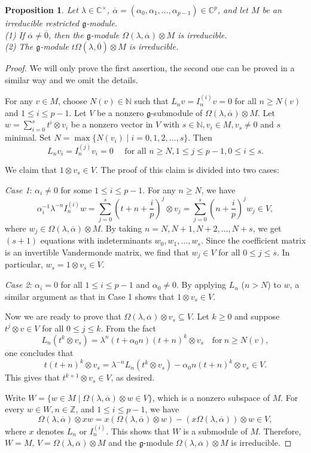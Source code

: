 \documentclass[12pt, reqno]{amsart}
\numberwithin{equation}{section}
\newtheorem{proposition}[theorem]{Proposition}%
\numberwithin{equation}{section}
\def\lmd{\lambda}
\def\al{\alpha}
\def\g{\mathfrak{g}}
\newcommand{\C}{\mathbb C}
\newcommand{\N}{\mathbb{N}}
\newcommand{\Z}{\mathbb{Z}}
\newcommand{\ov}[1]{\overline{#1}}
\newcommand{\elei}[2]{I_{#1}^{(#2)}}
\begin{document}
\begin{proposition}\label{prop5.1}
 Let $\lmd\in\C^\times$, $\ov\al=(\al_0,\al_1,\dots,\al_{p-1})\in\C^p$, and let $M$ be an irreducible restricted $\g$-module. \\
 (1) If $\ov\al\neq \ov0$, then the $\g$-module $\Omega(\lmd,\ov\al)\otimes M$ is irreducible.\\
 (2) The $\g$-module $t\Omega(\lmd,\ov0)\otimes M$ is irreducible.
\end{proposition}
\begin{proof}
 We will only prove the first assertion, the second one can be proved in a similar way and we omit the details.

 For any $v\in M$, choose $N(v)\in\N$ such that $L_nv=\elei ni v=0$ for all $n\geq N(v)$ and $1\leq i\leq p-1$.
 Let $V$ be a nonzero $\g$-submodule of $\Omega(\lmd,\ov\al)\otimes M$.
 Let $w=\sum_{i=0}^st^i\otimes v_i$ be a nonzero vector in $V$  with $s\in \N, v_i\in M, v_s\neq 0$ and $s$ minimal.
 Set $N=\max\{N(v_i)\mid i=0,1,2,\dots,s\}$. Then
 $$L_nv_i=\elei njv_i=0\quad\text{ for all }n\geq N, 1\leq j\leq p-1, 0\leq i\leq s.$$

 We claim that $1\otimes v_s\in V$.
 The proof of this claim is divided into two cases:

 {\em Case 1}: $\al_i\neq 0$ for some $1\leq i\leq p-1$. For any $n\geq N$, we have
 $$\al_i^{-1}\lmd^{-n}\elei niw=\sum_{j=0}^s\left(t+n+\frac ip\right)^j\otimes v_j=
      \sum_{j=0}^s\left(n+\frac ip\right)^jw_j\in V,$$
 where $w_j\in\Omega(\lmd,\ov\al)\otimes M$.
 By taking $n=N, N+1,N+2,\dots,N+s$, we get $(s+1)$ equations with indeterminants $w_0,w_1,\dots,w_s$.
 Since the coefficient matrix  is an invertible Vandermonde matrix,
 we find that $w_j\in V$ for all $0\le j\le s$.
 In particular, $w_s=1\otimes v_s\in V$.

 {\em Case 2}: $\al_i=0$ for all $1\leq i\leq p-1$ and $\al_0\neq 0$.
 By  applying $L_n$ ($n>N$) to $w$,
 a similar argument as that in Case 1 shows that $1\otimes v_s\in V$.

 Now we are ready to prove that  $\Omega(\lmd,\ov\al)\otimes v_s\subseteq V$.
Let $k\geq 0$ and
 suppose  $t^j\otimes v\in V$ for all $0\leq j\leq k$.
 From the fact
 \[L_n(t^k\otimes v_s)=\lmd^n(t+\al_0n)(t+n)^k\otimes v_s\quad \text{for}\  n\geq N(v),\]  one concludes that
 $$t(t+n)^k\otimes v_s=\lmd^{-n}L_n(t^k\otimes v_s)-\al_0n(t+n)^k\otimes v_s\in V.$$
 This gives that $t^{k+1}\otimes v_s\in V$, as desired.

 Write $W=\{w\in M\mid \Omega(\lmd,\ov\al)\otimes w\in V\}$, which is a nonzero subspace of $M$.
 For every $w\in W, n\in\Z$, and $1\leq i\leq p-1$, we have
 $$\Omega(\lmd,\ov\al)\otimes xw=x\left(\Omega(\lmd,\ov\al)\otimes
          w\right)-\left(x\Omega(\lmd,\ov\al)\right)\otimes w\in V,$$
 where $x$ denotes $L_n$ or $\elei ni$.
 This shows that $W$ is a submodule of $M$.
 Therefore, $W=M$, $V=\Omega(\lmd,\ov\al)\otimes M $ and the $\g$-module $\Omega(\lmd,\ov\al)\otimes M$ is irreducible.
\end{proof}
\end{document}
